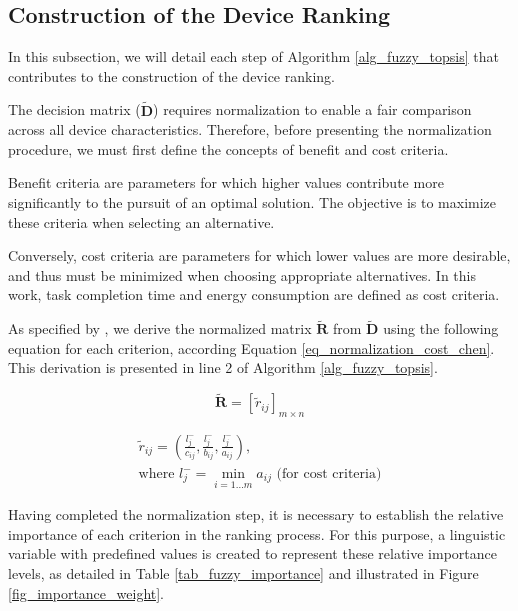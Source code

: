 \documentclass[iicol]{sn-jnl}
\begin{document}
\subsection{Construction of the Device Ranking}
In this subsection, we will detail each step of Algorithm \ref{alg_fuzzy_topsis} that contributes to the construction of the device ranking. 

The decision matrix ($\mathbf{\tilde{D}}$) requires normalization to enable a fair comparison across all device characteristics. Therefore, before presenting the normalization procedure, we must first define the concepts of benefit and cost criteria.

Benefit criteria are parameters for which higher values contribute more significantly to the pursuit of an optimal solution. The objective is to maximize these criteria when selecting an alternative.

Conversely, cost criteria are parameters for which lower values are more desirable, and thus must be minimized when choosing appropriate alternatives. In this work, task completion time and energy consumption are defined as cost criteria.

As specified by \cite{CHEN20001}, we derive the normalized matrix $\mathbf{\tilde{R}}$ from $\mathbf{\tilde{D}}$ using the following equation for each criterion, according Equation \eqref{eq_normalization_cost_chen}. This derivation is presented in line 2 of Algorithm \ref{alg_fuzzy_topsis}.


\begin{equation}
    \label{eq_normalized_matrix_chen}
    \mathbf{\tilde{R}} = [\tilde{r}_{ij}]_{m \times n}
\end{equation}

\begin{equation}
    \label{eq_normalization_cost_chen}
    \begin{split}
    \tilde{r}_{ij} = \left(\frac{l_j^-}{c_{ij}}, \frac{l_j^-}{b_{ij}}, \frac{l_j^-}{a_{ij}}\right), \\
    \text{where } l_j^- = \min_{i=1 \ldots m} a_{ij} \text{ (for cost criteria)}
\end{split}
\end{equation}

Having completed the normalization step, it is necessary to establish the relative importance of each criterion in the ranking process. For this purpose, a linguistic variable with predefined values is created to represent these relative importance levels, as detailed in Table \ref{tab_fuzzy_importance} and illustrated in Figure \ref{fig_importance_weight}.
\end{document}
